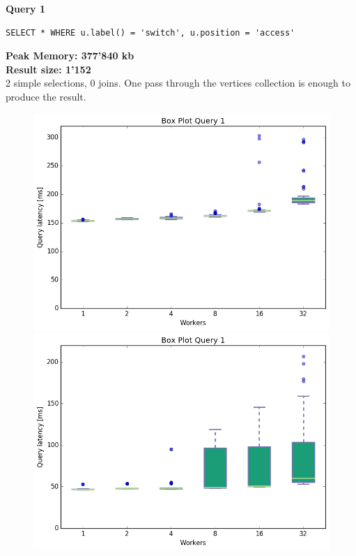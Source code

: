 \documentclass[11pt,singlecolumn]{scrartcl}
\begin{document}
\textbf{Query 1}\\
\begin{verbatim}
SELECT * WHERE u.label() = 'switch', u.position = 'access'
\end{verbatim}
\textbf{Peak Memory: 377'840 kb}\\
\textbf{Result size: 1'152} \\
2 simple selections, 0 joins. One pass through the vertices collection is enough to produce the result.
\clearpage
\begin{figure}[!tbp]
  \centering
  \RawFloats
  \begin{minipage}[b]{0.5\textwidth}
    \includegraphics[width=\textwidth]{boxesfl/q1}
  \end{minipage}
  \hfill
  \begin{minipage}[b]{0.5\textwidth}
    \includegraphics[width=\textwidth]{boxesfs/q1}
  \end{minipage}
\end{figure}
\end{document}

